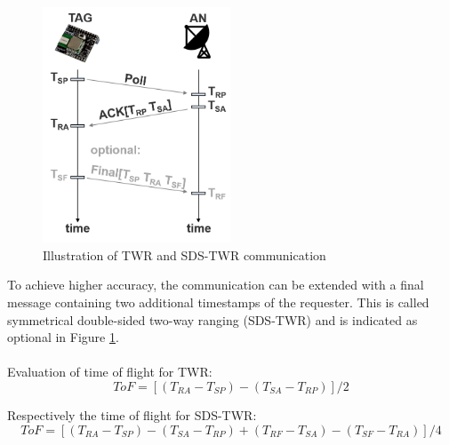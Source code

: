 \begin{figure}[th]
\centering
\includegraphics[width=0.5\textwidth]{Figures/two_way_ranging}
\decoRule
\caption[Two Way Ranging]{Illustration of TWR and SDS-TWR communication}
\label{fig:two_way_ranging}
\end{figure}

To achieve higher accuracy, the communication can be extended with a final message containing two additional timestamps of the requester. This is called symmetrical double-sided two-way ranging (SDS-TWR) \cite{Wikipedia} and is indicated as optional in Figure \ref{fig:two_way_ranging}.\\
\\
Evaluation of time of flight for TWR:\\
\begin{equation}
 ToF = [(T_{RA}-T_{SP})-(T_{SA}-T_{RP})] / 2
\label{eqn:TWR}
\end{equation}

Respectively the time of flight for SDS-TWR:\\
\begin{equation}
ToF = [(T_{RA}-T_{SP})-(T_{SA}-T_{RP}) + (T_{RF}-T_{SA})-(T_{SF}-T_{RA}) ]/ 4
\label{eqn:SDS-TWR}
\end{equation}

